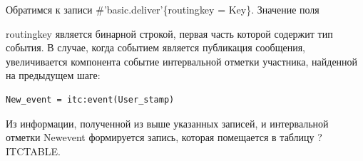 Обратимся к записи \#'basic.deliver'\{routing\underline{\hspace{0.25cm}}key = Key\}. Значение поля {routing\underline{\hspace{0.25cm}}key является бинарной строкой, первая часть которой содержит тип события. В случае, когда событием является публикация сообщения, увеличивается компонента событие интервальной отметки участника, найденной на предыдущем шаге:
\begin{lstlisting}
New_event = itc:event(User_stamp)
\end{lstlisting}
Из информации, полученной из выше указанных записей, и интервальной отметки New\underline{\hspace{0.25cm}}event формируется запись, которая помещается в таблицу ?ITC\underline{\hspace{0.25cm}}TABLE.

}
